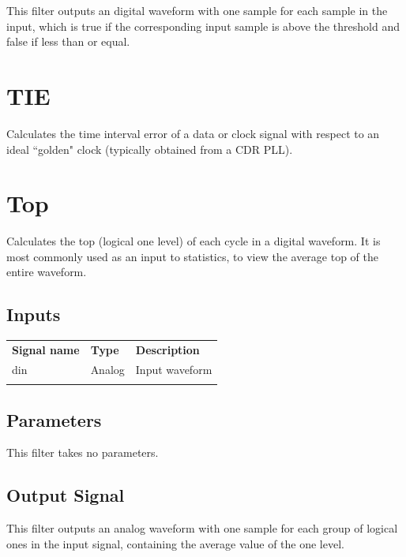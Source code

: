 This filter outputs an digital waveform with one sample for each sample in the input, which is true if the
corresponding input sample is above the threshold and false if less than or equal.

\pagebreak
\section{TIE}

Calculates the time interval error of a data or clock signal with respect to an ideal ``golden" clock (typically
obtained from a CDR PLL).

\pagebreak
\section{Top}

Calculates the top (logical one level) of each cycle in a digital waveform. It is most commonly used as an input to
statistics, to view the average top of the entire waveform.

\subsection{Inputs}

\begin{tabularx}{16cm}{llX}
\thickhline
\textbf{Signal name} & \textbf{Type} & \textbf{Description} \\
\thickhline
din & Analog & Input waveform \\
\thickhline
\end{tabularx}

\subsection{Parameters}

This filter takes no parameters.

\subsection{Output Signal}

This filter outputs an analog waveform with one sample for each group of logical ones in the input signal, containing
the average value of the one level.

